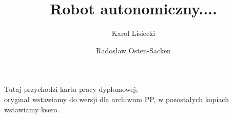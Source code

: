 \documentclass[polish,bachelor,a4paper,oneside]{ppfcmthesis}
\author{%
   Karol Lisiecki \album{106458} \and 
   Radosław Osten-Sacken \album{106520}}
\title{Robot autonomiczny....}                   %
\begin{document}
\frontmatter\pagestyle{empty}%
\maketitle\cleardoublepage%

\thispagestyle{empty}\vspace*{\fill}%
\begin{center}Tutaj przychodzi karta pracy dyplomowej;\\oryginał wstawiamy do wersji dla archiwum PP, w pozostałych kopiach wstawiamy ksero.\end{center}%
\vfill\cleardoublepage%

\pagestyle{ppfcmthesis}%
\tableofcontents* \cleardoublepage%

\mainmatter%
  













\cleardoublepage\appendix%
%

{\raggedright\sloppy\small}

\ppcolophon{}
\end{document}
